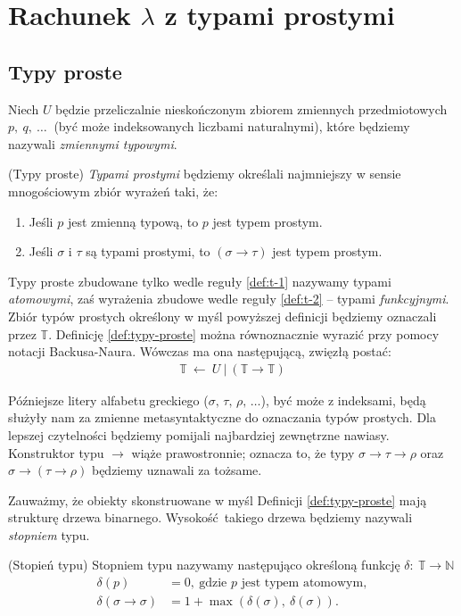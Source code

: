 \section{Rachunek \(\lambda\) z typami prostymi}
\subsection{Typy proste}\label{ssec:typy-proste}
Niech \(U\) będzie przeliczalnie nieskończonym zbiorem zmiennych przedmiotowych \(p,\ q,\ \dots\ \) (być może indeksowanych liczbami naturalnymi), które będziemy nazywali \emph{zmiennymi typowymi}.

\begin{definicja}\label{def:typy-proste}(Typy proste)
\emph{Typami prostymi} będziemy określali najmniejszy w sensie mnogościowym zbiór wyrażeń taki, że:
\begin{enumerate}[label=(S\arabic*)]
  \setlength\itemsep{0em}
  \item Jeśli \(p\) jest zmienną typową, to \(p\) jest typem prostym.\label{def:t-1}
  \item Jeśli \(\sigma\) i \(\tau\) są typami prostymi, to \(\left(\sigma\to\tau\right)\) jest typem prostym.\label{def:t-2}
\end{enumerate}
\end{definicja}

Typy proste zbudowane tylko wedle reguły \ref{def:t-1} nazywamy typami \emph{atomowymi}, zaś wyrażenia zbudowe wedle reguły \ref{def:t-2} -- typami \emph{funkcyjnymi}. Zbiór typów prostych określony w myśl powyższej definicji będziemy oznaczali przez \(\mathbb{T}\). Definicję \ref{def:typy-proste} można równoznacznie wyrazić przy pomocy notacji Backusa-Naura. Wówczas ma ona następującą, zwięzłą postać:
\begin{align*}
  \mathbb{T}\ \leftarrow \ U\ |\ (\mathbb{T}\to\mathbb{T})
\end{align*}

Późniejsze litery alfabetu greckiego (\(\sigma,\, \tau,\, \rho,\,\dots\)), być może z indeksami, będą służyły nam za zmienne metasyntaktyczne do oznaczania typów prostych. Dla lepszej czytelności będziemy pomijali najbardziej zewnętrzne nawiasy. Konstruktor typu \(\to\) wiąże prawostronnie; oznacza to, że typy \(\sigma\to\tau\to\rho\) oraz \(\sigma\to(\tau\to\rho)\) będziemy uznawali za tożsame.

Zauważmy, że obiekty skonstruowane w myśl Definicji \ref{def:typy-proste} mają strukturę drzewa binarnego. Wysokość takiego drzewa będziemy nazywali \emph{stopniem} typu. 
\begin{definicja}\label{def:stopien-typu}(Stopień typu)
  Stopniem typu nazywamy następująco określoną funkcję \(\delta :\: \mathbb{T} \to \mathbb{N}\)
  \begin{align*}
    \delta(p) &= 0,\ \text{gdzie \(p\) jest typem atomowym},\\
    \delta(\sigma\to\sigma)&=1 + \max\left(\delta(\sigma),\ \delta(\sigma)\right).
  \end{align*}
\end{definicja}

